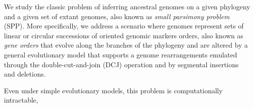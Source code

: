     We study the classic problem of inferring ancestral genomes on a given phylogeny and a given set of extant genomes, also known as \emph{small parsimony problem} (SPP). 
    More specifically, we address a scenario where genomes represent sets of linear or circular successions of oriented genomic markers orders, also known as \emph{gene orders} that evolve along the branches of the phylogeny and are altered by a general evolutionary model that supports a genome rearrangements emulated through the double-cut-and-join (DCJ) operation and by segmental insertions and deletions.

    Even under simple evolutionary models, this problem is computationally intractable, 
